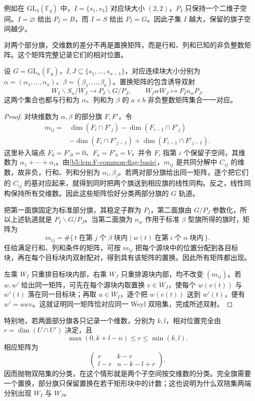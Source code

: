 例如在 \(\mathrm{GL}_4(\mathbb F_q)\) 中，\(I=\{s_1,s_3\}\) 对应块大小 \((2,2)\)，\(P_I\) 只保持一个二维子空间。\(I=\varnothing\) 给出 \(P_I=B\)，而 \(I=S\) 给出 \(P_I=G\)。因此子集 \(I\) 越大，保留的旗子空间越少。

\ProseParagraphBreak
对两个部分旗，交维数的差分不再是置换矩阵，而是行和、列和已知的非负整数矩阵。这个矩阵完整记录它们的相对位置。

\begin{proposition}\label{b5:prop:F-parabolic-double-cosets}
	设 \(G=\mathrm{GL}_n(\mathbb F_q)\)，\(I,J\subseteq\{s_1,\ldots,s_{n-1}\}\)，对应连续块大小分别为 \(\alpha=(\alpha_1,\ldots,\alpha_a)\)、\(\beta=(\beta_1,\ldots,\beta_b)\)。置换矩阵的包含诱导双射
	\[
		W_I\backslash S_n/W_J\longrightarrow P_I\backslash G/P_J,
		\qquad W_IwW_J\longmapsto P_In_wP_J.
	\]
	这两个集合也都与行和为 \(\alpha\)、列和为 \(\beta\) 的 \(a\times b\) 非负整数矩阵集合一一对应。
\end{proposition}
\begin{proof}
	对块维数为 \(\alpha,\beta\) 的部分旗 \(F,F'\)，令
	\[
		\begin{aligned}
			m_{ij}={}&\dim(F_i\cap F'_j)-\dim(F_{i-1}\cap F'_j)\\
			&-\dim(F_i\cap F'_{j-1})+\dim(F_{i-1}\cap F'_{j-1}).
		\end{aligned}
	\]
	这里补入端点 \(F_0=F'_0=0\)、\(F_a=F'_b=V\)，并令 \(F_i\) 指第 \(i\) 个保留子空间，其维数为 \(\alpha_1+\cdots+\alpha_i\)。由\cref{b5:lem:F-common-flag-basis}，\(m_{ij}\) 是共同分解中 \(C_{ij}\) 的维数，故非负，行和、列和分别为 \(\alpha_i,\beta_j\)。若两对部分旗给出同一矩阵，逐个把它们的 \(C_{ij}\) 的基对应起来，就得到同时把两个旗送到相应旗的线性同构。反之，线性同构保持所有交维数。因此这些矩阵恰好分类两部分旗的 \(G\) 轨道。

	把第一面旗固定为标准部分旗，其稳定子群为 \(P_I\)，第二面旗由 \(G/P_J\) 参数化，所以上述轨道就是 \(P_I\backslash G/P_J\)。当第二面旗为 \(n_w\) 作用于标准 \(\beta\) 型旗所得的旗时，矩阵为
	\[
		m_{ij}=\#\{\,t\;\text{在第}\;j\;\text{个}\;\beta\;\text{块内}\mid w(t)\;\text{在第}\;i\;\text{个}\;\alpha\;\text{块内}\,\}.
	\]
	任给满足行和、列和条件的矩阵，可按 \(m_{ij}\) 把每个源块中的位置分配到各目标块，再在每个目标块内双射配对，得到具有该矩阵的置换。因此所有矩阵都出现。

	左乘 \(W_I\) 只重排目标块内部，右乘 \(W_J\) 只重排源块内部，均不改变 \((m_{ij})\)。若 \(w,w'\) 给出同一矩阵，可先在每个源块内取置换 \(v\in W_J\)，使每个 \(w(v(t))\) 与 \(w'(t)\) 落在同一目标块；再取 \(u\in W_I\)，逐个把 \(w(v(t))\) 送到 \(w'(t)\)，便有 \(w'=uwv\)。这就证明同一矩阵恰对应同一 Weyl 双陪集，完成所述双射。
\end{proof}

特别地，若两面部分旗各只记录一个维数，分别为 \(k,l\)，相对位置完全由 \(r=\dim(U\cap U')\) 决定，且
\[
	\max(0,k+l-n)\le r\le\min(k,l).
\]
相应矩阵为
\[
	\begin{pmatrix}
		r&k-r\\
		l-r&n-k-l+r
	\end{pmatrix}.
\]
因而抛物双陪集的分类，在这个情形就是两个子空间按交维数的分类。完全旗需要一个置换，部分旗只保留置换在若干矩形块中的计数；这也说明为什么双陪集两端分别出现 \(W_I\) 与 \(W_J\)。
